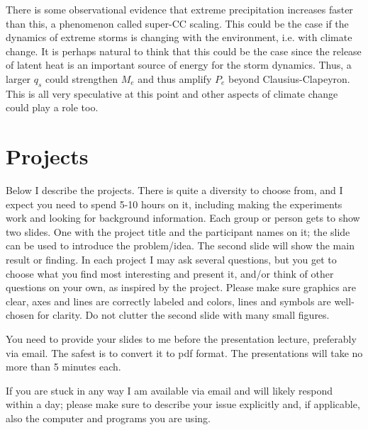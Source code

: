\documentclass[12pt]{book}
\begin{document}
There is some observational evidence that extreme precipitation increases faster than this, a phenomenon called super-CC scaling. This could be the case if the dynamics of extreme storms is changing with the environment, i.e. with climate change. It is perhaps natural to think that this could be the case since the release of latent heat is an important source of energy for the storm dynamics. Thus, a larger $q_s$ could strengthen $M_e$ and thus amplify $P_e$ beyond Clausius-Clapeyron.  This is all very speculative at this point and other aspects of climate change could play a role too.


\clearpage
\appendix
\chapter{Projects}

Below I describe the projects. There is quite a diversity to choose from, and I expect you need to spend 5-10 hours on it, including making the experiments work and looking for background information. 
Each group or person gets to show two slides. One with the project title and the participant names on it; the slide can be used to introduce the problem/idea. The second slide will show the main result or finding. In each project I may ask several questions, but you get to choose what you find most interesting and present it, and/or think of other questions on your own, as inspired by the project. Please make sure graphics are clear, axes and lines are correctly labeled and colors, lines and symbols are well-chosen for clarity. Do not clutter the second slide with many small figures.

\vspace{0.5 cm}
\noindent
You need to provide your slides to me before the presentation lecture, preferably via email. The safest is to convert it to pdf format. The presentations will take no more than 5 minutes each. 

\vspace{0.5 cm}
\noindent
If you are stuck in any way I am available via email and will likely respond within a day; please make sure to describe your issue explicitly and, if applicable, also the computer and programs you are using.
\end{document}
